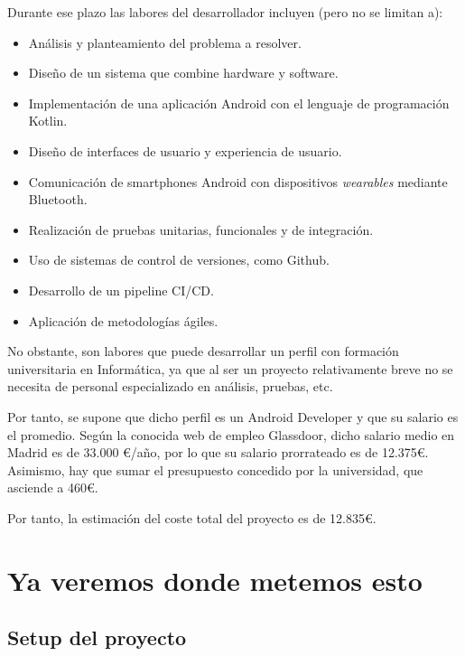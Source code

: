                Durante ese plazo las labores del desarrollador incluyen (pero no se limitan a):
                \begin{itemize}
                    \item Análisis y planteamiento del problema a resolver.
                    \item Diseño de un sistema que combine hardware y software.
                    \item Implementación de una aplicación Android con el lenguaje de programación Kotlin.
                    \item Diseño de interfaces de usuario y experiencia de usuario. 
                    \item Comunicación de smartphones Android con dispositivos \textit{wearables} mediante Bluetooth.
                    \item Realización de pruebas unitarias, funcionales y de integración.
                    \item Uso de sistemas de control de versiones, como Github.
                    \item Desarrollo de un pipeline CI/CD.
                    \item Aplicación de metodologías ágiles.
                \end{itemize}
                
                No obstante, son labores que puede desarrollar un perfil con formación universitaria en Informática, ya que al ser un proyecto relativamente breve no se necesita de personal especializado en análisis, pruebas, etc. 
                
                Por tanto, se supone que dicho perfil es un Android Developer y que su salario es el promedio. Según la conocida web de empleo Glassdoor, dicho salario medio en Madrid es de 33.000 €/año, por lo que su salario prorrateado es de 12.375€. Asimismo, hay que sumar el presupuesto concedido por la universidad, que asciende a 460€.
                
                Por tanto, la estimación del coste total del proyecto es de 12.835€.

\chapter{Ya veremos donde metemos esto}
    \section{Setup del proyecto}
